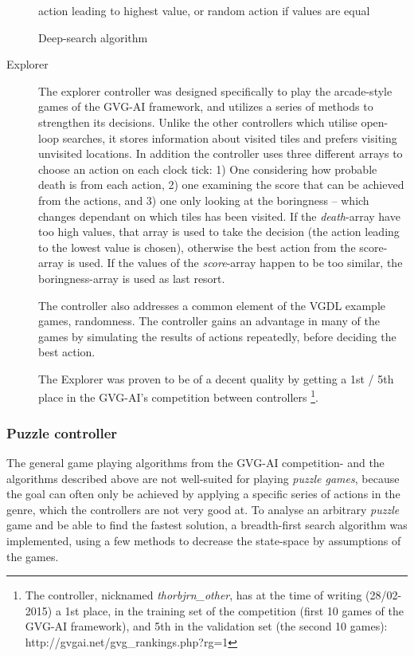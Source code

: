 \documentclass[a4paper,titlepage,final]{report}
\begin{document}
\begin{description}
\begin{algorithm}[H]
{{		
	}
}
\Return action leading to highest value, or random action if values are equal
\caption{Deep-search algorithm}
\end{algorithm}

\item[Explorer]
The explorer controller was designed specifically to play the arcade-style games of the GVG-AI framework, and utilizes a series of methods to strengthen its decisions. 
Unlike the other controllers which utilise open-loop searches, it stores information about visited tiles and prefers visiting unvisited locations. 
In addition the controller uses three different arrays to choose an action on each clock tick: 
1) One considering how probable death is from each action, 2) one examining the score that can be achieved from the actions, and 3) one only looking at the boringness -- which changes dependant on which tiles has been visited.
If the \textit{death}-array have too high values, that array is used to take the decision (the action leading to the lowest value is chosen), otherwise the best action from the score-array is used.
If the values of the \textit{score}-array happen to be too similar, the boringness-array is used as last resort.

The controller also addresses a common element of the VGDL example games, randomness. The controller gains an advantage in many of the games by simulating the results of actions repeatedly, before deciding the best action.

The Explorer was proven to be of a decent quality by getting a 1st / 5th place in the GVG-AI's competition between controllers \footnote{The controller, nicknamed \textit{thorbjrn_other}, has at the time of writing (28/02-2015) a 1st place, in the training set of the competition (first 10 games of the GVG-AI framework), and 5th in the validation set (the second 10 games): http://gvgai.net/gvg_rankings.php?rg=1}.
\end{description}



\subsubsection*{Puzzle controller}
The general game playing algorithms from the GVG-AI competition- and the algorithms described above are not well-suited for playing \textit{puzzle games}, because the goal can often only be achieved by applying a specific series of actions in the genre, which the controllers are not very good at.
To analyse an arbitrary \textit{puzzle} game and be able to find the fastest solution, a breadth-first search algorithm was implemented, using a few methods to decrease the state-space by assumptions of the games.
\end{document}
